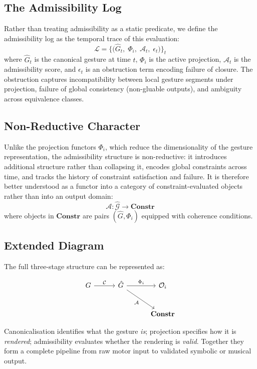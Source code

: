 \documentclass[11pt, a4paper]{article}
\begin{document}
\subsection{The Admissibility Log}

Rather than treating admissibility as a static predicate, we define the
admissibility log as the temporal trace of this evaluation:
\[
  \mathcal{L} = \bigl\{ \bigl(\hat{G}_t,\; \Phi_i,\; \mathcal{A}_t,\; \epsilon_t\bigr) \bigr\}_{t}
\]
where $\hat{G}_t$ is the canonical gesture at time $t$, $\Phi_i$ is the
active projection, $\mathcal{A}_t$ is the admissibility score, and
$\epsilon_t$ is an obstruction term encoding failure of closure. The
obstruction captures incompatibility between local gesture segments under
projection, failure of global consistency (non-gluable outputs), and
ambiguity across equivalence classes.

\subsection{Non-Reductive Character}

Unlike the projection functors $\Phi_i$, which reduce the
dimensionality of the gesture representation, the admissibility structure
is non-reductive: it introduces additional structure rather than
collapsing it, encodes global constraints across time, and tracks the
history of constraint satisfaction and failure. It is therefore better
understood as a functor into a category of constraint-evaluated objects
rather than into an output domain:
\[
  \mathcal{A} : \hat{\mathcal{G}} \to \mathbf{Constr}
\]
where objects in $\mathbf{Constr}$ are pairs $(\hat{G}, \Phi_i)$
equipped with coherence conditions.

\subsection{Extended Diagram}

The full three-stage structure can be represented as:

\[
\begin{tikzcd}[column sep=3em, row sep=2.5em]
  G \arrow[r, "\mathcal{C}"]
    & \hat{G} \arrow[r, "\Phi_i"] \arrow[dr, "\mathcal{A}"']
    & \mathcal{O}_i \\
    &  & \mathbf{Constr}
\end{tikzcd}
\]

Canonicalisation identifies what the gesture \emph{is}; projection
specifies how it is \emph{rendered}; admissibility evaluates whether the
rendering is \emph{valid}. Together they form a complete pipeline from
raw motor input to validated symbolic or musical output.
\end{document}
